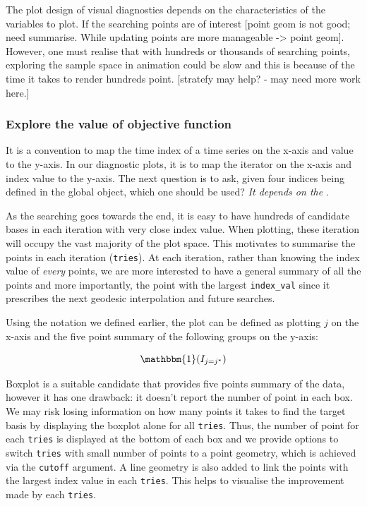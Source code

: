 \documentclass[12pt]{article}
\begin{document}
The plot design of visual diagnostics depends on the characteristics of
the variables to plot. If the searching points are of interest {[}point
geom is not good; need summarise. While updating points are more
manageable -\textgreater{} point geom{]}. However, one must realise that
with hundreds or thousands of searching points, exploring the sample
space in animation could be slow and this is because of the time it
takes to render hundreds point. {[}stratefy may help? - may need more
work here.{]}

\hypertarget{static}{%
\subsubsection{Explore the value of objective function}\label{static}}

It is a convention to map the time index of a time series on the x-axis
and value to the y-axis. In our diagnostic plots, it is to map the
iterator on the x-axis and index value to the y-axis. The next question
is to ask, given four indices being defined in the global object, which
one should be used? \emph{It depends on the }.

As the searching goes towards the end, it is easy to have hundreds of
candidate bases in each iteration with very close index value. When
plotting, these iteration will occupy the vast majority of the plot
space. This motivates to summarise the points in each iteration
(\texttt{tries}). At each iteration, rather than knowing the index value
of \emph{every} points, we are more interested to have a general summary
of all the points and more importantly, the point with the largest
\texttt{index\_val} since it prescribes the next geodesic interpolation
and future searches.

Using the notation we defined earlier, the plot can be defined as
plotting \(j\) on the x-axis and the five point summary of the following
groups on the y-axis:

\[\mathbbm{1}(I_{j = j^*})\]

Boxplot is a suitable candidate that provides five points summary of the
data, however it has one drawback: it doesn't report the number of point
in each box. We may risk losing information on how many points it takes
to find the target basis by displaying the boxplot alone for all
\texttt{tries}. Thus, the number of point for each \texttt{tries} is
displayed at the bottom of each box and we provide options to switch
\texttt{tries} with small number of points to a point geometry, which is
achieved via the \texttt{cutoff} argument. A line geometry is also added
to link the points with the largest index value in each \texttt{tries}.
This helps to visualise the improvement made by each \texttt{tries}.
\end{document}
